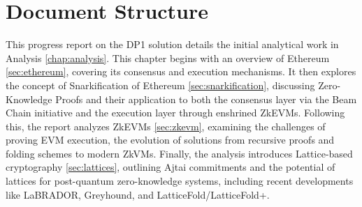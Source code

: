 \section*{Document Structure}

This progress report on the DP1 solution details the initial analytical work
in Analysis \ref{chap:analysis}. This chapter begins with an overview of
Ethereum \ref{sec:ethereum}, covering its consensus and execution mechanisms.
It then explores the concept of Snarkification of Ethereum \ref{sec:snarkification},
discussing Zero-Knowledge Proofs and their application to both the consensus
layer via the Beam Chain initiative and the execution layer through enshrined
ZkEVMs. Following this, the report analyzes ZkEVMs \ref{sec:zkevm},
examining the challenges of proving EVM execution, the evolution of solutions
from recursive proofs and folding schemes to modern ZkVMs. Finally, the
analysis introduces Lattice-based cryptography \ref{sec:lattices}, outlining
Ajtai commitments and the potential of lattices for post-quantum
zero-knowledge systems, including recent developments like LaBRADOR,
Greyhound, and LatticeFold/LatticeFold+.
